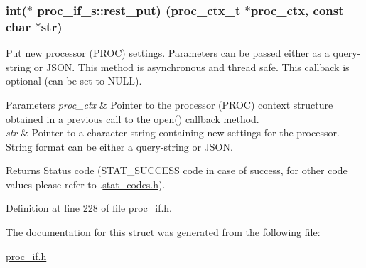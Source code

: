 \subsubsection[{\texorpdfstring{rest\+\_\+put}{rest_put}}]{\setlength{\rightskip}{0pt plus 5cm}int($\ast$ proc\+\_\+if\+\_\+s\+::rest\+\_\+put) ({\bf proc\+\_\+ctx\+\_\+t} $\ast$proc\+\_\+ctx, const char $\ast$str)}\hypertarget{structproc__if__s_acb4d2c240c52904ebd6904f54b1a9b78}{}\label{structproc__if__s_acb4d2c240c52904ebd6904f54b1a9b78}
Put new processor (P\+R\+OC) settings. Parameters can be passed either as a query-\/string or J\+S\+ON. This method is asynchronous and thread safe. This callback is optional (can be set to N\+U\+LL). 
\begin{DoxyParams}{Parameters}
{\em proc\+\_\+ctx} & Pointer to the processor (P\+R\+OC) context structure obtained in a previous call to the \textquotesingle{}\hyperlink{structproc__if__s_a34999576771394dfb721463c8455ba06}{open()}\textquotesingle{} callback method. \\
\hline
{\em str} & Pointer to a character string containing new settings for the processor. String format can be either a query-\/string or J\+S\+ON. \\
\hline
\end{DoxyParams}
\begin{DoxyReturn}{Returns}
Status code (S\+T\+A\+T\+\_\+\+S\+U\+C\+C\+E\+SS code in case of success, for other code values please refer to .\hyperlink{stat__codes_8h}{stat\+\_\+codes.\+h}). 
\end{DoxyReturn}


Definition at line 228 of file proc\+\_\+if.\+h.



The documentation for this struct was generated from the following file\+:\begin{DoxyCompactItemize}
\item 
\hyperlink{proc__if_8h}{proc\+\_\+if.\+h}\end{DoxyCompactItemize}
